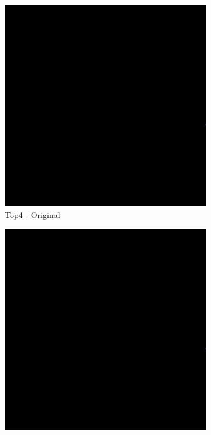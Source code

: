 \begin{figure}[H]
\begin{subfigure}{0.32\textwidth}
    \includegraphics[width=\textwidth]{02-main//figures/ch4/kfold_ensembles/unet_tu-mambaout_small/worst_cases/worst_2_iou0.000_24951112_tile_4_13_2bd653_original.png}
    \caption{Top4 - Original}
\end{subfigure}
\hfill
\begin{subfigure}{0.32\textwidth}
    \includegraphics[width=\textwidth]{02-main//figures/ch4/kfold_ensembles/unet_tu-mambaout_small/worst_cases/worst_2_iou0.000_24951112_tile_4_13_2bd653_overlay_gt.png}

\end{subfigure}
\end{figure}
